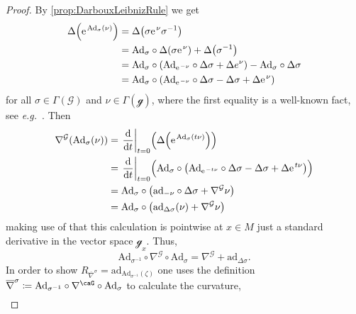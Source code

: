 \documentclass[reqno,a4paper,oneside]{amsart}
\newcommand{\e}{\ensuremath{\mathrm{e\;\!}}}
\theoremstyle{plain}
\theoremstyle{remark}
\theoremstyle{definition}
\begin{document}
\begin{proof}
\leavevmode\newline
By \ref{prop:DarbouxLeibnizRule} we get
\begin{align*}
\Delta\mleft( \e^{\mathrm{Ad}_\sigma (\nu)} \mright)
&=
\Delta\mleft( \sigma \e^{\nu} \sigma^{-1} \mright)
\\
&=
\mathrm{Ad}_{\sigma} \circ \Delta \mleft( \sigma \e^\nu \mright)
	+ \Delta \mleft( \sigma^{-1} \mright)
\\
&=
\mathrm{Ad}_{\sigma} \circ \mleft( \mathrm{Ad}_{\e^{-\nu}} \circ \Delta \sigma + \Delta e^\nu \mright)
	- \mathrm{Ad}_\sigma \circ \Delta \sigma
\\
&=
\mathrm{Ad}_{\sigma} \circ \mleft( \mathrm{Ad}_{\e^{-\nu}} \circ \Delta \sigma
	- \Delta \sigma + \Delta \e^\nu \mright)
\end{align*}
for all $\sigma \in \Gamma(\mathcal{G})$ and $\nu \in \Gamma(\mathcal{g})$, where the first equality is a well-known fact, see \textit{e.g.}\ \cite[\S 1.7, Thm.\ 1.7.16, page 59]{Hamilton}. Then
\begin{align*}
\nabla^{\mathcal{G}}\mleft( \mathrm{Ad}_\sigma(\nu) \mright)
&=
\mleft. \frac{\mathrm{d}}{\mathrm{d}t} \mright|_{t=0} \mleft(
	\Delta\mleft( \e^{\mathrm{Ad}_\sigma (t\nu)} \mright)
\mright)
\\
&=
\mleft. \frac{\mathrm{d}}{\mathrm{d}t} \mright|_{t=0} \Bigl(
	\mathrm{Ad}_{\sigma} \circ \mleft( \mathrm{Ad}_{\e^{-t\nu}} \circ \Delta \sigma
	- \Delta \sigma + \Delta \e^{t\nu} \mright)
\Bigr)
\\
&=
\mathrm{Ad}_{\sigma} \circ \mleft( \mathrm{ad}_{-\nu} \circ \Delta \sigma
	+ \nabla^{\mathcal{G}} \nu \mright)
\\
&=
\mathrm{Ad}_{\sigma} \circ \mleft( \mathrm{ad}_{\Delta \sigma}(\nu)
	+ \nabla^{\mathcal{G}} \nu \mright)
\end{align*}
making use of that this calculation is pointwise at $x \in M$ just a standard derivative in the vector space $\mathcal{g}_x$. Thus,
\begin{equation*}
\mathrm{Ad}_{\sigma^{-1}} \circ \nabla^{\mathcal{G}} \circ \mathrm{Ad}_\sigma
=
\nabla^{\mathcal{G}}
	+ \mathrm{ad}_{\Delta \sigma}.
\end{equation*}
In order to show $R_{\overline{\nabla}^\sigma} = \mathrm{ad}_{\mathrm{Ad}_{\sigma^{-1}}(\zeta)}$ one uses the definition $\overline{\nabla}^\sigma \coloneqq \mathrm{Ad}_{\sigma^{-1}} \circ \nabla^\caG \circ \mathrm{Ad}_\sigma$ to calculate the curvature, 
\begin{align*}

\end{align*}
\end{proof}
\end{document}
